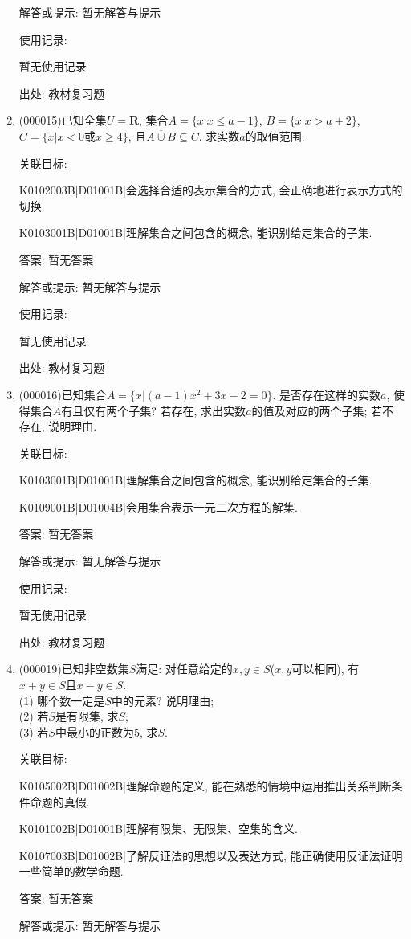 \documentclass[10pt,a4paper]{article}
\begin{document}
\begin{enumerate}[1.]
解答或提示: 暂无解答与提示

使用记录:

暂无使用记录


出处: 教材复习题
\item { (000015)}已知全集$U=\mathbf{R}$, 集合$A=\{x|x\le a-1\}$, $B=\{x|x>a+2\}$, $C=\{x|x<0\text{或}x\ge 4\}$, 且$\overline{A\cup B}\subseteq C$. 求实数$a$的取值范围.


关联目标:

K0102003B|D01001B|会选择合适的表示集合的方式, 会正确地进行表示方式的切换.

K0103001B|D01001B|理解集合之间包含的概念, 能识别给定集合的子集.

答案: 暂无答案

解答或提示: 暂无解答与提示

使用记录:

暂无使用记录


出处: 教材复习题
\item { (000016)}已知集合$A=\{x|(a-1)x^2+3x-2=0\}$. 是否存在这样的实数$a$, 使得集合$A$有且仅有两个子集? 若存在, 求出实数$a$的值及对应的两个子集; 若不存在, 说明理由.


关联目标:

K0103001B|D01001B|理解集合之间包含的概念, 能识别给定集合的子集.

K0109001B|D01004B|会用集合表示一元二次方程的解集.

答案: 暂无答案

解答或提示: 暂无解答与提示

使用记录:

暂无使用记录


出处: 教材复习题
\item { (000019)}已知非空数集$S$满足: 对任意给定的$x,y\in S$($x,y$可以相同), 有$x+y\in S$且$x-y\in S$.\\
(1) 哪个数一定是$S$中的元素? 说明理由;\\
(2) 若$S$是有限集, 求$S$;\\
(3) 若$S$中最小的正数为$5$, 求$S$.


关联目标:

K0105002B|D01002B|理解命题的定义, 能在熟悉的情境中运用推出关系判断条件命题的真假.

K0101002B|D01001B|理解有限集、无限集、空集的含义.

K0107003B|D01002B|了解反证法的思想以及表达方式, 能正确使用反证法证明一些简单的数学命题.

答案: 暂无答案

解答或提示: 暂无解答与提示


\end{enumerate}
\end{document}
